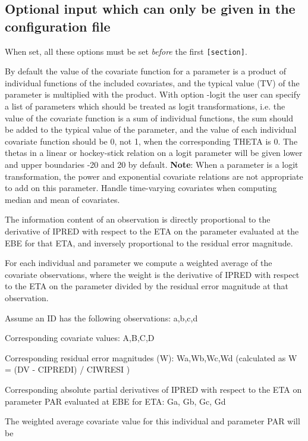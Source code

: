 \subsection{Optional input which can only be given in the configuration file}
When set, all these options must be set \emph{before} the first \verb|[section]|.
\begin{optionlist}
By default the value of the covariate function for a parameter is a product of individual functions of the included covariates, and the typical value (TV) of the parameter is multiplied with the product. With option -logit the user can specify a list of parameters which should be treated as logit transformations, i.e. the value of the covariate function is a sum of individual functions, the sum should be added to the typical value of the parameter, and the value of each individual covariate function should be 0, not 1, when the corresponding THETA is 0. The thetas in a linear or hockey-stick relation on a logit parameter will be given lower and upper boundaries -20 and 20 by default. \textbf{Note}: When a parameter is a logit transformation, the power and exponential covariate relations are not appropriate to add on this parameter. 
\nextopt
{}
Handle time-varying covariates when computing median and mean of covariates.
	
The information content of an observation is directly proportional to the derivative of IPRED with respect to the ETA on the parameter evaluated at the EBE for that ETA, and inversely proportional to the residual error magnitude.

For each individual and parameter we compute a weighted average of the covariate observations, where the weight is the derivative of IPRED with respect to the ETA on the parameter divided by the residual error magnitude at that observation.
	
Assume an ID has the following observations: a,b,c,d
	
Corresponding covariate values: A,B,C,D
	
Corresponding residual error magnitudes (W): Wa,Wb,Wc,Wd (calculated as W = (DV - CIPREDI) / CIWRESI )
	
Corresponding absolute partial derivatives of IPRED with respect to the ETA on parameter PAR evaluated at EBE for ETA: Ga, Gb, Gc, Gd
	
The weighted average covariate value for this individual and parameter PAR will be
	

\end{optionlist}
